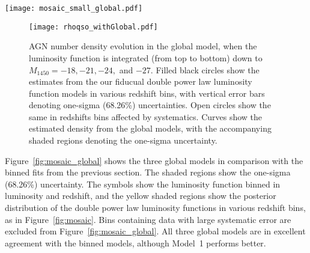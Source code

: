\documentclass[fleqn,usenatbib]{mnras}
\begin{document}
\begin{figure*}
  \begin{center}
    \texttt{[image: mosaic\_small\_global.pdf]}
  \end{center}
  \caption{Luminosity function estimates from $z=0.6$ to $6.5$.
    Similar to Figure~\ref{fig:mosaic}, the symbols show our inferred
    binned luminosity functions.  In each redshift bin, yellow curves
    show our fiducial double power law luminosity function model in
    that redshift bin.  Other curves show the three global evolution
    models.  Shaded regions show the one-sigma (68.26\%)
    uncertainties.}
  \label{fig:mosaic_global}
\end{figure*}

\begin{figure}
  \begin{center}
    \texttt{[image: rhoqso\_withGlobal.pdf]}
  \end{center}
  \caption{AGN number density evolution in the global model, when the
    luminosity function is integrated (from top to bottom) down to
    $M_\mathrm{1450}=-18, -21, -24,$ and $-27$.  Filled black circles
    show the estimates from the our fiducual double power law
    luminosity function models in various redshift bins, with vertical
    error bars denoting one-sigma (68.26\%) uncertainties.  Open
    circles show the same in redshifts bins affected by systematics.
    Curves show the estimated density from the global models, with the
    accompanying shaded regions denoting the one-sigma uncertainty. }
  \label{fig:rhoqso}
\end{figure}

Figure~\ref{fig:mosaic_global} shows the three global models in
comparison with the binned fits from the previous section.  The shaded
regions show the one-sigma (68.26\%) uncertainty.  The symbols show
the luminosity function binned in luminosity and redshift, and the
yellow shaded regions show the posterior distribution of the double
power law luminosity functions in various redshift bins, as in
Figure~\ref{fig:mosaic}.  Bins containing data with large systematic
error are excluded from Figure~\ref{fig:mosaic_global}.  All three
global models are in excellent agreement with the binned models,
although Model~1 performs better.
\end{document}
